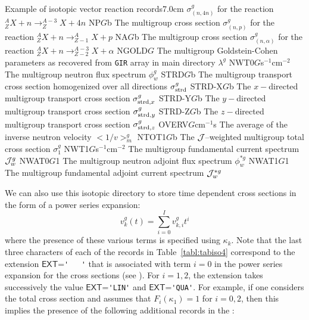 \begin{DescriptionEnregistrement}{Example of isotopic vector reaction records}{7.0cm}
{   $\sigma_{(n,4n)}^{g}$ for the reaction 
   $^{A}_{Z}X+n \to ^{A-3}_{Z}X+4n$}
\RealEnr
  {NP}{$G$}{b}
  {The multigroup cross section
   $\sigma_{(n,p)}^{g}$ for the reaction 
   $^{A}_{Z}X+n \to ^{A}_{Z-1}X+p$}
\RealEnr
  {NA}{$G$}{b}
  {The multigroup cross section
   $\sigma_{(n,\alpha)}^{g}$ for the reaction 
   $^{A}_{Z}X+n \to ^{A-3}_{Z-2}X+\alpha$ }
\RealEnr
  {NGOLD}{$G$}{} 
  {The multigroup Goldstein-Cohen parameters as recovered from {\tt GIR} array in main  directory
   $\lambda^{g}$}
\RealEnr
  {NWT0}{$G$}{s$^{-1}$cm$^{-2}$}
  {The multigroup neutron flux spectrum $\phi_{w}^{g}$} 
\RealEnr
  {STRD}{$G$}{b}
  {The multigroup transport cross section 
   homogenized over all directions
   $\sigma_{\rm strd}^{g}$}
\RealEnr
  {STRD-X}{$G$}{b} 
  {The $x-$directed multigroup transport cross
   section $\sigma_{{\rm strd},x}^{g}$}
\RealEnr
  {STRD-Y}{$G$}{b} 
  {The $y-$directed multigroup transport cross
   section $\sigma_{{\rm strd},y}^{g}$}
\RealEnr
  {STRD-Z}{$G$}{b}
  {The $z-$directed multigroup transport cross
   section $\sigma_{{\rm strd},z}^{g}$}
\RealEnr
  {OVERV}{$G$}{cm$^{-1}$s}
  {The average of the inverse neutron velocity \hbox{$<1/v>_{m}^g$}}
\RealEnr
  {NTOT1}{$G$}{b}
  {The ${\cal J}$--weighted multigroup total cross section $\sigma_1^{g}$}
\RealEnr
  {NWT1}{$G$}{s$^{-1}$cm$^{-2}$}
  {The multigroup fundamental current spectrum ${\cal J}_{w}^{g}$} 
\RealEnr
  {NWAT0}{$G$}{1}
  {The multigroup neutron adjoint flux spectrum $\phi_{w}^{*g}$} 
\RealEnr
  {NWAT1}{$G$}{1}
  {The multigroup fundamental adjoint current spectrum ${\cal J}_{w}^{*g}$} 
\end{DescriptionEnregistrement}

\vskip 0.2cm

We can also use this isotopic directory to store time dependent cross sections in the form of a power series expansion:
\begin{equation}
    v_{k}^{g}(t)=\sum_{i=0}^{I} v_{k,i}^{g} t^{i}
\label{eq:TimeSerie}
\end{equation}
where the presence of these various terms is specified using $\kappa_{k}$.
Note that the last three characters of each of the records in Table~\ref{tabl:tabiso4} correspond to the extension $\mathsf{EXT}$=\verb*|'   '| that is
associated with term $i=0$ in the power series expansion for the cross sections (see
). For $i=1, 2$, the extension takes successively the value $\mathsf{EXT}$=\verb*|'LIN'| and $\mathsf{EXT}$=\verb*|'QUA'|.
For example, if one considers the total cross section and assumes that $F_{i}(\kappa_{1})=1$ for $i=0,2$, then this implies the presence
of the following additional records in the :

